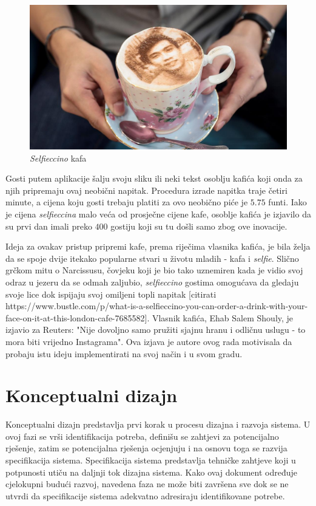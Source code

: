 \documentclass[12pt]{article}
\begin{document}
\begin{figure}[!h]
\centering
\includegraphics[scale=0.3]{slika_1}
\caption{\textit{Selfieccino} kafa}
\label{slika_1}
\end{figure}

Gosti putem aplikacije \v{s}alju svoju sliku ili neki tekst osoblju kafi\'ca koji onda za njih pripremaju ovaj neobi\v{c}ni napitak. Procedura izrade napitka traje \v{c}etiri minute, a cijena koju gosti trebaju platiti za ovo neobi\v{c}no pi\'ce je $5.75$ funti. Iako je cijena \textit{selfieccina} malo ve\'ca od prosje\v{c}ne cijene kafe, osoblje kafi\'ca je izjavilo da su prvi dan imali preko $400$ gostiju koji su tu do\v{s}li samo zbog ove inovacije.

Ideja za ovakav pristup pripremi kafe, prema rije\v{c}ima vlasnika kafi\'ca, je bila \v{z}elja da se spoje dvije itekako popularne stvari u \v{z}ivotu mladih - kafa i \textit{selfie}. Slično grčkom mitu o Narcissusu, čovjeku koji je bio tako uznemiren kada je vidio svoj odraz u jezeru da se odmah zaljubio, \textit{selfieccino} gostima omogućava da gledaju svoje lice dok ispijaju svoj omiljeni topli napitak [citirati https://www.bustle.com/p/what-is-a-selfieccino-you-can-order-a-drink-with-your-face-on-it-at-this-london-cafe-7685582]. Vlasnik kafi\'ca, Ehab Salem Shouly, je izjavio za Reuters: "Nije dovoljno samo pružiti sjajnu hranu i odličnu uslugu - to mora biti vrijedno Instagrama". Ova izjava je autore ovog rada motivisala da probaju istu ideju implementirati na svoj na\v{c}in i u svom gradu. 

\section{Konceptualni dizajn}

Konceptualni dizajn predstavlja prvi korak u procesu dizajna i razvoja sistema. U ovoj fazi se vrši identifikacija potreba, definišu se zahtjevi za potencijalno rješenje, zatim se potencijalna rješenja ocjenjuju i na osnovu toga se razvija specifikacija sistema. Specifikacija sistema predstavlja tehničke zahtjeve koji u potpunosti utiču na daljnji tok dizajna sistema. Kako ovaj dokument određuje cjelokupni budući razvoj, navedena faza ne može biti završena sve dok se ne utvrdi da specifikacije sistema adekvatno adresiraju identifikovane potrebe.
\end{document}
